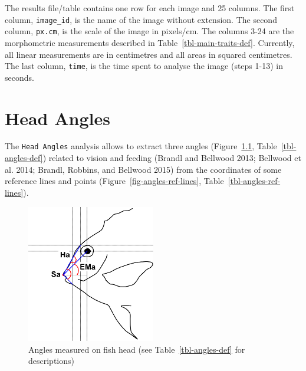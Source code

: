 \documentclass[
  letterpaper,
]{scrbook}
\begin{document}
The results file/table contains one row for each image and 25 columns.
The first column, \texttt{image\_id}, is the name of the image without
extension. The second column, \texttt{px.cm}, is the scale of the image
in pixels/cm. The columns 3-24 are the morphometric measurements
described in Table~\ref{tbl-main-traits-def}. Currently, all linear
measurements are in centimetres and all areas in squared centimetres.
The last column, \texttt{time}, is the time spent to analyse the image
(steps 1-13) in seconds.

\hypertarget{sec-head_angles}{%
\chapter{Head Angles}\label{sec-head_angles}}

The \texttt{Head\ Angles} analysis allows to extract three angles
(Figure~\ref{fig-head-angles}, Table~\ref{tbl-angles-def}) related to
vision and feeding (Brandl and Bellwood 2013; Bellwood et al. 2014;
Brandl, Robbins, and Bellwood 2015) from the coordinates of some
reference lines and points (Figure~\ref{fig-angles-ref-lines},
Table~\ref{tbl-angles-ref-lines}).

\begin{figure}

{\centering \includegraphics[width=0.5\textwidth,height=\textheight]{./images/drawings/head_angles_sketch.png}

}

\caption{\label{fig-head-angles}Angles measured on fish head (see
Table~\ref{tbl-angles-def} for descriptions)}

\end{figure}
\end{document}
